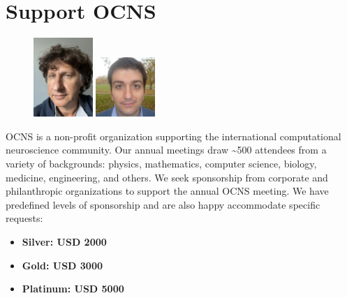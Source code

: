 \documentclass[11pt,a4paper,oneside]{article}
\begin{document}
\clearpage


\clearpage

\clearpage

\clearpage
\section*{Support OCNS}%
%
\begin{figure}
  \includegraphics[width=0.2\textwidth]{images/Garagnani}
  \includegraphics[width=0.2\textwidth]{images/Pinotsis}
\end{figure}

OCNS is a non-profit organization supporting the international computational neuroscience community.
Our annual meetings draw \textasciitilde{}500 attendees from a variety of backgrounds: physics, mathematics, computer science, biology, medicine, engineering, and others.
We seek sponsorship from corporate and philanthropic organizations to support the annual OCNS meeting.
We have predefined levels of sponsorship and are also happy accommodate specific requests:

\begin{multicols}{2}
    \begin{itemize}
      \item \textbf{Silver: USD 2000}
      \item \textbf{Gold: USD 3000}
      \item \textbf{Platinum: USD 5000}
    \end{itemize}
\end{multicols}
\end{document}
